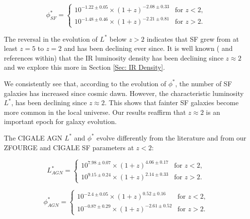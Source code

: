 \begin{equation*}
    \phi^{*}_{SF} =
    \begin{cases} 
        10^{-1.22 \pm 0.05} \times (1+z)^{-2.08 \pm 0.33} & \text{for } z < 2, \\
        10^{-1.48 \pm 0.46} \times (1+z)^{-2.21 \pm 0.81} & \text{for } z > 2.
    \end{cases}
\end{equation*}

The reversal in the evolution of $L^{*}$ below $z>2$ indicates that SF grew from at least $z=5$ to $z=2$ and has been declining ever since. It is well known (\citealp{gruppioni_herschel_2013,  madau_cosmic_2014} and references within) that the IR luminosity density has been declining since $z\approx2$ and we explore this more in Section \ref{Sec: IR Density}. 


We consistently see that, according to the evolution of $\phi^{*}$, the number of SF galaxies has increased since cosmic dawn. However, the characteristic luminosity $L^{*}$, has been declining since $z\approx2$. This shows that fainter SF galaxies become more common in the local universe. Our results reaffirm that $z\approx2$ is an important epoch for galaxy evolution.

The CIGALE AGN $L^{*}$ and $\phi^{*}$ evolve differently from the literature and from our ZFOURGE and CIGALE SF parameters at $z<2$:

\begin{equation*}
    L^{*}_{AGN} =
    \begin{cases} 
        10^{7.98 \pm 0.07} \times (1+z)^{4.06 \pm 0.17} & \text{for } z < 2, \\
        10^{9.15 \pm 0.24} \times (1+z)^{2.14 \pm 0.33} & \text{for } z > 2.
    \end{cases}
\end{equation*}

\begin{equation*}
    \phi^{*}_{AGN} =
    \begin{cases} 
        10^{-2.4 \pm 0.05} \times (1+z)^{0.52 \pm 0.16} & \text{for } z < 2, \\
        10^{-0.87 \pm 0.29} \times (1+z)^{-2.61 \pm 0.52} & \text{for } z > 2.
    \end{cases}
\end{equation*}

